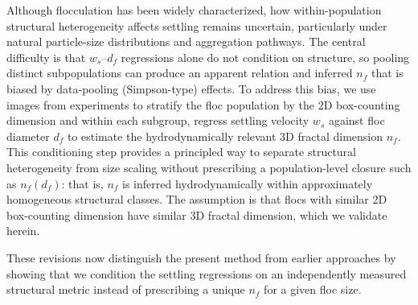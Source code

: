 \documentclass[11pt]{article}
\newenvironment{Snippet}{%
  \par\vspace{0.3em}\begin{list}{}{\setlength{\leftmargin}{1em}\setlength{\rightmargin}{0.5em}}\item\small\itshape
}{%
  \end{list}\vspace{0.3em}
}
\begin{document}
\begin{enumerate}[label=\textbf{R3.\arabic*.}]
\begin{Snippet}
Although flocculation has been widely characterized, how within-population structural heterogeneity affects settling remains uncertain, particularly under natural particle-size distributions and aggregation pathways. The central difficulty is that $w_s$--$d_f$ regressions alone do not condition on structure, so pooling distinct subpopulations can produce an apparent relation and inferred $n_f$ that is biased by data-pooling (Simpson-type) effects. To address this bias, we use images from experiments to stratify the floc population by the 2D box-counting dimension and within each subgroup, regress settling velocity $w_s$ against floc diameter $d_f$ to estimate the hydrodynamically relevant 3D fractal dimension $n_f$. This conditioning step provides a principled way to separate structural heterogeneity from size scaling without prescribing a population-level closure such as $n_f(d_f)$: that is, $n_f$ is inferred hydrodynamically within approximately homogeneous structural classes. The assumption is that flocs with similar 2D box-counting dimension have similar 3D fractal dimension, which we validate herein.
\end{Snippet}
These revisions now distinguish the present method from earlier approaches by showing that we condition the settling regressions on an independently measured structural metric instead of prescribing a unique $n_f$ for a given floc size.


\end{enumerate}
\end{document}
